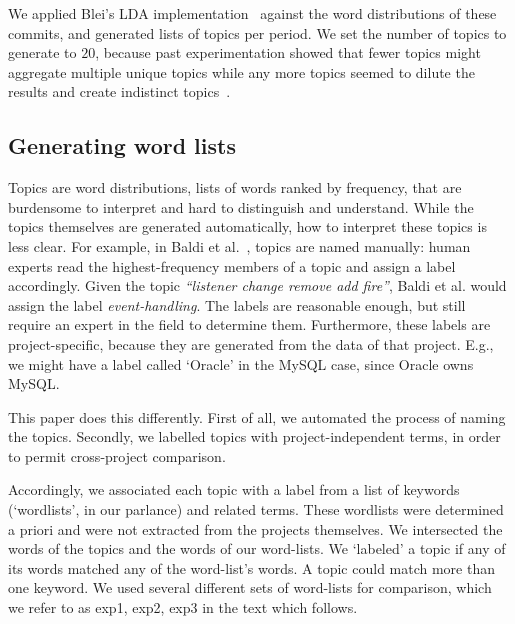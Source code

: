 \documentclass[]{sig-alternate}
\begin{document}
We applied Blei's LDA implementation~\cite{Blei2003} against the word distributions of these commits, and generated lists of topics per period. 
We set the number of topics to generate to $20$, because past experimentation showed that fewer topics might aggregate multiple unique topics while any more topics seemed to dilute the results and create indistinct topics~\cite{Hindle09ICSM}. 

\subsection{Generating word lists}
\label{sec:genwordlist}




Topics are word distributions, lists of words ranked by frequency, that are burdensome to interpret and hard to distinguish and understand. 
While the topics themselves are generated automatically, how to interpret these topics is less clear.
For example,
in Baldi et al.~\cite{Baldi2008}, topics are named manually: human experts read the highest-frequency members of a topic and assign a label accordingly. 
Given the topic \emph{``listener change remove add fire''}, Baldi et al. would assign the label \emph{event-handling}. 
The labels are reasonable enough, but still require an expert in the field to determine them. 
Furthermore, these labels are project-specific, because they are generated from the data of that project. E.g., we might have a label called `Oracle' in the MySQL case, since Oracle owns MySQL. 

This paper does this differently. First of all, we automated the process of naming the topics. Secondly, we labelled topics with project-independent terms, in order to permit cross-project comparison.

Accordingly, we associated each topic with a label from a list
of keywords (`wordlists', in our parlance) and related terms. These wordlists were determined a priori and were not extracted from the projects themselves.
We intersected the words of the topics and the words of our word-lists.
We `labeled' a topic if any of its words matched any of the word-list's words.
A topic could match more than one keyword.
We used several different sets of word-lists for comparison, which we refer to as \textsf{exp1, exp2, exp3} in the text which follows. 
\end{document}
